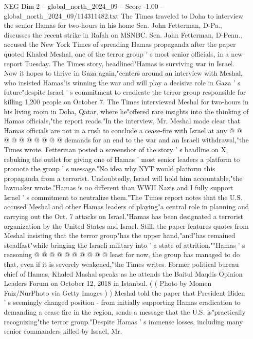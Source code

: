 \begin{textsample}{NEG Dim 2 – global\_north\_2024\_09 – Score -1.00 – global\_north\_2024\_09/114311482.txt}  \label{ex:f2_neg_031}
The Times traveled to Doha to interview the senior Hamas for two-hours in his home Sen.
John Fetterman, D-Pa., discusses the recent strike in Rafah on MSNBC.
Sen.
John Fetterman, D-Penn., accused the New York Times of spreading Hamas propaganda after the paper quoted Khaled Meshal, one of the terror group ' s most senior officials, in a new report Tuesday.
The Times story, headlined"Hamas is surviving war in Israel.
Now it hopes to thrive in Gaza again,"centers around an interview with Meshal, who insisted Hamas"is winning the war and will play a decisive role in Gaza ' s future"despite Israel ' s commitment to eradicate the terror group responsible for killing 1,200 people on October 7.
The Times interviewed Meshal for two-hours in his living room in Doha, Qatar, where he"offered rare insights into the thinking of Hamas officials,"the report reads."In the interview, Mr.
Meshal made clear that Hamas officials are not in a rush to conclude a cease-fire with Israel at any @ @ @ @ @ @ @ @ @ @ demands for an end to the war and an Israeli withdrawal,"the Times wrote.
Fetterman posted a screenshot of the story ' s headline on X, rebuking the outlet for giving one of Hamas ' most senior leaders a platform to promote the group ' s message."No idea why NYT would platform this propaganda from a terrorist.
Undoubtedly, Israel will hold him accountable,"the lawmaker wrote."Hamas is no different than WWII Nazis and I fully support Israel ' s commitment to neutralize them."The Times report notes that the U.S. accused Meshal and other Hamas leaders of playing"a central role in planning and carrying out the Oct. 7 attacks on Israel."Hamas has been designated a terrorist organization by the United States and Israel.
Still, the paper features quotes from Meshal insisting that the terror group"has the upper hand,"and"has remained steadfast"while bringing the Israeli military into ' a state of attrition.""Hamas ' s reasoning @ @ @ @ @ @ @ @ @ @ least for now, the group has managed to do that, even if it is severely weakened,"the Times writes.
Former political bureau chief of Hamas, Khaled Mashal speaks as he attends the Baitul Maqdis Opinion Leaders Forum on October 12, 2018 in Istanbul. ( ( Photo by Momen Faiz/NurPhoto via Getty Images ) ) Meshal told the paper that President Biden ' s seemingly changed position - from initially supporting Hamas eradication to demanding a cease fire in the region, sends a message that the U.S. is"practically recognizing"the terror group."Despite Hamas ' s immense losses, including many senior commanders killed by Israel, Mr.

\end{textsample}
